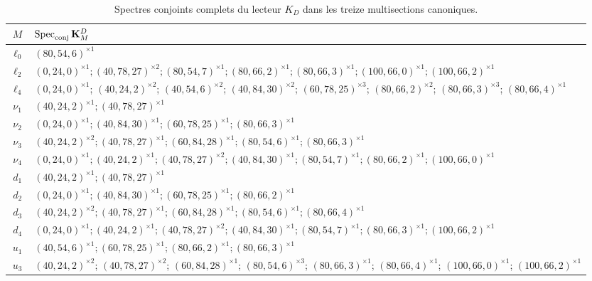 \begingroup\footnotesize
\begin{longtable}{@{}c p{}@{}}
\caption{Spectres conjoints complets du lecteur \(K_D\) dans les treize
multisections canoniques.}
\\
\toprule
\(M\)&\(\operatorname{Spec}_{\rm conj}\mathbf K_M^D\)\\
\midrule
\endhead
\(\ell_0\)&\((80,54,6)^{\times1}\)\\
\(\ell_2\)&\((0,24,0)^{\times1};(40,78,27)^{\times2};(80,54,7)^{\times1};(80,66,2)^{\times1};(80,66,3)^{\times1};(100,66,0)^{\times1};(100,66,2)^{\times1}\)\\
\(\ell_4\)&\((0,24,0)^{\times1}\); \((40,24,2)^{\times2}\); \((40,54,6)^{\times2}\); \((40,84,30)^{\times2}\); \((60,78,25)^{\times3}\); \((80,66,2)^{\times2}\); \((80,66,3)^{\times3}\); \((80,66,4)^{\times1}\)\\
\(\nu_1\)&\((40,24,2)^{\times1};(40,78,27)^{\times1}\)\\
\(\nu_2\)&\((0,24,0)^{\times1};(40,84,30)^{\times1};(60,78,25)^{\times1};(80,66,3)^{\times1}\)\\
\(\nu_3\)&\((40,24,2)^{\times2};(40,78,27)^{\times1};(60,84,28)^{\times1};(80,54,6)^{\times1};(80,66,3)^{\times1}\)\\
\(\nu_4\)&\((0,24,0)^{\times1};(40,24,2)^{\times1};(40,78,27)^{\times2};(40,84,30)^{\times1};(80,54,7)^{\times1};(80,66,2)^{\times1};(100,66,0)^{\times1}\)\\
\(d_1\)&\((40,24,2)^{\times1};(40,78,27)^{\times1}\)\\
\(d_2\)&\((0,24,0)^{\times1};(40,84,30)^{\times1};(60,78,25)^{\times1};(80,66,2)^{\times1}\)\\
\(d_3\)&\((40,24,2)^{\times2};(40,78,27)^{\times1};(60,84,28)^{\times1};(80,54,6)^{\times1};(80,66,4)^{\times1}\)\\
\(d_4\)&\((0,24,0)^{\times1};(40,24,2)^{\times1};(40,78,27)^{\times2};(40,84,30)^{\times1};(80,54,7)^{\times1};(80,66,3)^{\times1};(100,66,2)^{\times1}\)\\
\(u_1\)&\((40,54,6)^{\times1};(60,78,25)^{\times1};(80,66,2)^{\times1};(80,66,3)^{\times1}\)\\
\(u_3\)&\((40,24,2)^{\times2}\); \((40,78,27)^{\times2}\); \((60,84,28)^{\times1}\); \((80,54,6)^{\times3}\); \((80,66,3)^{\times1}\); \((80,66,4)^{\times1}\); \((100,66,0)^{\times1}\); \((100,66,2)^{\times1}\)\\
\bottomrule
\end{longtable}
\label{tab:espectros-kd-multisecciones-rev11}
\endgroup

